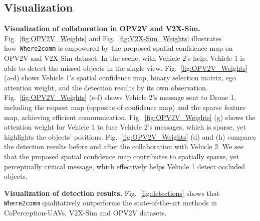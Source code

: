 \subsection{Visualization}
\textbf{Visualization of collaboration in OPV2V and V2X-Sim.} Fig.~\ref{fig:OPV2V_Weights} and Fig.~\ref{fig:V2X-Sim_Weights} illustrates how~\texttt{Where2comm} is empowered by the proposed spatial confidence map on OPV2V and V2X-Sim dataset. In the scene, with Vehicle 2's help, Vehicle 1 is able to detect the missed objects in the single view. Fig.~\ref{fig:OPV2V_Weights} (a-d) shows Vehicle 1's spatial confidence map, binary selection matrix, ego attention weight, and the detection results by its own observation. Fig.~\ref{fig:OPV2V_Weights} (e-f) shows Vehicle 2's message sent to Drone 1, including the request map (opposite of confidence map) and the sparse feature map, achieving efficient communication. Fig.~\ref{fig:OPV2V_Weights} (g) shows the attention weight for Vehicle 1 to fuse Vehicle 2's messages, which is sparse, yet highlights the objects' positions. Fig.~\ref{fig:OPV2V_Weights} (d) and (h) compares the detection results before and after the collaboration with Vehicle 2. We see that the proposed spatial confidence map contributes to spatially sparse, yet perceptually critical message, which effectively helps Vehicle 1 detect occluded objects.

\textbf{Visualization of detection results.} Fig.~\ref{fig:detections} shows that \texttt{Where2comm} qualitatively outperforms the state-of-the-art methods in CoPerception-UAVs, V2X-Sim and OPV2V datasets. 







